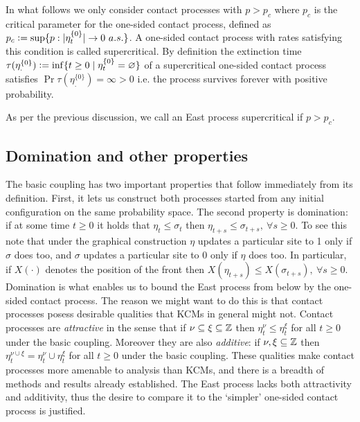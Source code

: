 In what follows we only consider contact processes with $p > p_c$ where $p_c$ is the critical parameter for the one-sided contact process, defined as $p_c \vcentcolon= \sup\{ p : |\eta^{\{0\}}_t| \rightarrow 0\ a.s.\}$. A one-sided contact process with rates satisfying this condition is called supercritical. By definition the extinction time $\tau(\eta^{\{0\}}_.) \vcentcolon= \inf\{t \geq 0 \mid \eta^{\{0\}}_t = \varnothing \}$ of a supercritical one-sided contact process satisfies $\Pr{\tau(\eta^{\{0\}}_.) = \infty} > 0$ i.e. the process survives forever with positive probability. 

\begin{notation}
As per the previous discussion, we call an East process supercritical if $p > p_c$. 
\end{notation}

\subsection{Domination and other properties}\label{ssec:intro_properties}
The basic coupling has two important properties that follow immediately from its definition. First, it lets us construct both processes started from any initial configuration on the same probability space. The second property is domination: if at some time $t \geq 0$ it holds that $\eta_t \leq \sigma_t$ then $\eta_{t+s} \leq \sigma_{t+s},\ \forall s \geq 0$. To see this note that under the graphical construction $\eta$ updates a particular site to 1 only if $\sigma$ does too, and $\sigma$ updates a particular site to 0 only if $\eta$ does too. In particular, if $X(\cdot)$ denotes the position of the front then $X(\eta_{t+s}) \leq X(\sigma_{t+s}),\ \forall s \geq 0$. \\

Domination is what enables us to bound the East process from below by the one-sided contact process. The reason we might want to do this is that contact processes posess desirable qualities that KCMs in general might not. Contact processes are \textit{attractive} in the sense that if $\nu \subseteq \xi \subseteq \mathbb{Z}$ then $\eta^\nu_t \leq \eta^\xi_t$ for all $t \geq 0$ under the basic coupling. Moreover they are also \textit{additive}: if $\nu, \xi \subseteq \mathbb{Z}$ then $\eta^{\nu \cup \xi}_t = \eta^\nu_t \cup \eta^\xi_t$ for all $t \geq 0$ under the basic coupling. These qualities make contact processes more amenable to analysis than KCMs, and there is a breadth of methods and results already established. The East process lacks both attractivity and additivity, thus the desire to compare it to the `simpler' one-sided contact process is justified. 
